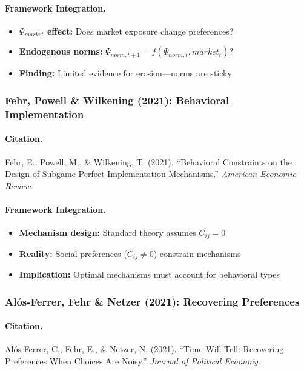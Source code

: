 \paragraph{Framework Integration.}
\begin{itemize}
  \item \textbf{$\Psi_{market}$ effect:} Does market exposure change preferences?
  \item \textbf{Endogenous norms:} $\Psi_{norm,t+1} = f(\Psi_{norm,t}, market_t)$?
  \item \textbf{Finding:} Limited evidence for erosion---norms are sticky
\end{itemize}

\subsubsection{Fehr, Powell \& Wilkening (2021): Behavioral Implementation}

\paragraph{Citation.}
Fehr, E., Powell, M., \& Wilkening, T. (2021).
``Behavioral Constraints on the Design of Subgame-Perfect Implementation Mechanisms.''
\emph{American Economic Review}.

\paragraph{Framework Integration.}
\begin{itemize}
  \item \textbf{Mechanism design:} Standard theory assumes $C_{ij} = 0$
  \item \textbf{Reality:} Social preferences ($C_{ij} \neq 0$) constrain mechanisms
  \item \textbf{Implication:} Optimal mechanisms must account for behavioral types
\end{itemize}

\subsubsection{Al\'os-Ferrer, Fehr \& Netzer (2021): Recovering Preferences}

\paragraph{Citation.}
Al\'os-Ferrer, C., Fehr, E., \& Netzer, N. (2021).
``Time Will Tell: Recovering Preferences When Choices Are Noisy.''
\emph{Journal of Political Economy}.

